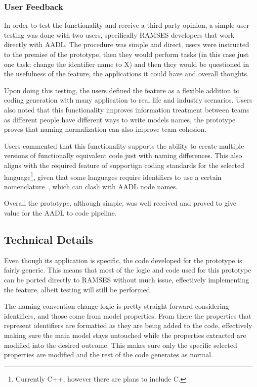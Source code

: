 \subsubsection{User Feedback}

In order to test the functionality and receive a third party opinion, a simple user testing was done with two users, specifically \gls{RAMSES} developers that work directly with \gls{AADL}. The procedure was simple and direct, users were instructed to the premise of the prototype, then they would perform tasks (in this case just one task: change the \gls{identifier} name to X) and then they would be questioned in the usefulness of the feature, the applications it could have and overall thoughts.

Upon doing this testing, the users defined the feature as a flexible addition to coding generation with many application to real life and industry scenarios. Users also noted that this functionality improves information treatment between teams as different people have different ways to write models names, the prototype proves that naming normalization can also improve team cohesion.

Users commented that this functionality supports the ability to create multiple versions of functionally equivalent code just with naming differences. This also aligns with the required feature of supportign coding standards for the selected language\footnote{Currently C++, however there are plans to include C.}, given that some languages require \glspl{identifier} to use a certain nomenclature~\cite{Google_cpp_style_guide, Python_coding_style}, which can clash with \gls{AADL} node names.

Overall the prototype, although simple, was well received and proved to give value for the \gls{AADL} to code pipeline.

\subsection{Technical Details}
\label{sec:prototype_technical_details}

Even though its application is specific, the code developed for the prototype is fairly generic. This means that most of the logic and code used for this prototype can be ported directly to RAMSES without much issue, effectively implementing the feature, albeit testing will still be performed.

The naming convention change logic is pretty straight forward considering \glspl{identifier}, and those come from model properties. From there the properties that represent \glspl{identifier} are formatted as they are being added to the code, effectively making sure the main model stays untouched while the properties extracted are modified into the desired outcome. This makes sure only the specific selected properties are modified and the rest of the code generates as normal.


